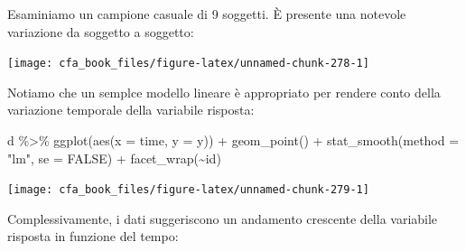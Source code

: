 \documentclass[
  11pt,
]{krantz}
\makeatletter
\newenvironment{Shaded}{\begin{snugshade}}{\end{snugshade}}
\newcommand{\AttributeTok}[1]{\textcolor[rgb]{0.61,0.61,0.61}{#1}}
\newcommand{\ConstantTok}[1]{\textcolor[rgb]{0,0,0}{#1}}
\newcommand{\DecValTok}[1]{\textcolor[rgb]{0.06,0.06,0.06}{#1}}
\newcommand{\FunctionTok}[1]{\textcolor[rgb]{0,0,0}{#1}}
\newcommand{\NormalTok}[1]{#1}
\newcommand{\OtherTok}[1]{\textcolor[rgb]{0.37,0.37,0.37}{#1}}
\newcommand{\SpecialCharTok}[1]{\textcolor[rgb]{0,0,0}{#1}}
\newcommand{\StringTok}[1]{\textcolor[rgb]{0.5,0.5,0.5}{#1}}
\newenvironment{kframe}{%
\medskip{}
\setlength{\fboxsep}{.8em}
 \def\at@end@of@kframe{}%
 \ifinner\ifhmode%
  \def\at@end@of@kframe{\end{minipage}}%
  \begin{minipage}{\columnwidth}%
 \fi\fi%
 \def\FrameCommand##1{\hskip\@totalleftmargin \hskip-\fboxsep
 \colorbox{shadecolor}{##1}\hskip-\fboxsep
     \hskip-\linewidth \hskip-\@totalleftmargin \hskip\columnwidth}%
 \MakeFramed {\advance\hsize-\width
   \@totalleftmargin\z@ \linewidth\hsize
   \@setminipage}}%
 {\par\unskip\endMakeFramed%
 \at@end@of@kframe}
\renewenvironment{Shaded}{\begin{kframe}}{\end{kframe}}
\theoremstyle{definition}
\theoremstyle{definition}
\theoremstyle{definition}
\theoremstyle{definition}
\theoremstyle{remark}
\makeatother
\begin{document}
Esaminiamo un campione casuale di 9 soggetti. È presente una notevole variazione da soggetto a soggetto:

\begin{Shaded}
\end{Shaded}

\begin{center}\texttt{[image: cfa\_book\_files/figure-latex/unnamed-chunk-278-1]} \end{center}

Notiamo che un semplce modello lineare è appropriato per rendere conto della variazione temporale della variabile risposta:

\begin{Shaded}
\begin{Highlighting}[]
\NormalTok{d }\SpecialCharTok{\%\textgreater{}\%}
  \FunctionTok{ggplot}\NormalTok{(}\FunctionTok{aes}\NormalTok{(}\AttributeTok{x =}\NormalTok{ time, }\AttributeTok{y =}\NormalTok{ y)) }\SpecialCharTok{+}
  \FunctionTok{geom\_point}\NormalTok{() }\SpecialCharTok{+}
  \FunctionTok{stat\_smooth}\NormalTok{(}\AttributeTok{method =} \StringTok{"lm"}\NormalTok{, }\AttributeTok{se =} \ConstantTok{FALSE}\NormalTok{) }\SpecialCharTok{+}
  \FunctionTok{facet\_wrap}\NormalTok{(}\SpecialCharTok{\textasciitilde{}}\NormalTok{id)}
\end{Highlighting}
\end{Shaded}

\begin{center}\texttt{[image: cfa\_book\_files/figure-latex/unnamed-chunk-279-1]} \end{center}

Complessivamente, i dati suggeriscono un andamento crescente della variabile risposta in funzione del tempo:
\end{document}
